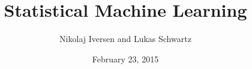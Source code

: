 \documentclass[12pt,a4paper]{article}
\begin{document}
\title{Statistical Machine Learning}
\author{Nikolaj Iversen and Lukas Schwartz}
\date{February 23, 2015}
\maketitle

\newpage

\tableofcontents
\listoffigures
\listoftables

\newpage



\end{document}
